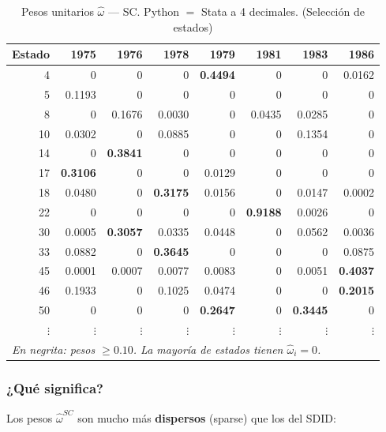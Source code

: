 \documentclass[11pt, a4paper]{article}
\begin{document}
\begin{table}[H]
\centering
\caption{Pesos unitarios $\hat{\omega}$ --- SC. Python $=$ Stata a 4 decimales. (Selección de estados)}
\small
\begin{tabular}{rrrrrrrr}
\toprule
Estado & 1975 & 1976 & 1978 & 1979 & 1981 & 1983 & 1986 \\
\midrule
4  & 0      & 0      & 0      & \textbf{0.4494} & 0      & 0      & 0.0162 \\
5  & 0.1193 & 0      & 0      & 0      & 0      & 0      & 0      \\
8  & 0      & 0.1676 & 0.0030 & 0      & 0.0435 & 0.0285 & 0      \\
10 & 0.0302 & 0      & 0.0885 & 0      & 0      & 0.1354 & 0      \\
14 & 0      & \textbf{0.3841} & 0      & 0      & 0      & 0      & 0      \\
17 & \textbf{0.3106} & 0      & 0      & 0.0129 & 0      & 0      & 0      \\
18 & 0.0480 & 0      & \textbf{0.3175} & 0.0156 & 0      & 0.0147 & 0.0002 \\
22 & 0      & 0      & 0      & 0      & \textbf{0.9188} & 0.0026 & 0      \\
30 & 0.0005 & \textbf{0.3057} & 0.0335 & 0.0448 & 0      & 0.0562 & 0.0036 \\
33 & 0.0882 & 0      & \textbf{0.3645} & 0      & 0      & 0      & 0.0875 \\
45 & 0.0001 & 0.0007 & 0.0077 & 0.0083 & 0      & 0.0051 & \textbf{0.4037} \\
46 & 0.1933 & 0      & 0.1025 & 0.0474 & 0      & 0      & \textbf{0.2015} \\
50 & 0      & 0      & 0      & \textbf{0.2647} & 0      & \textbf{0.3445} & 0      \\
$\vdots$ & $\vdots$ & $\vdots$ & $\vdots$ & $\vdots$ & $\vdots$ & $\vdots$ & $\vdots$ \\
\midrule
\multicolumn{8}{l}{\textit{En negrita: pesos $\geq 0.10$. La mayoría de estados tienen $\hat{\omega}_i=0$.}} \\
\bottomrule
\end{tabular}
\end{table}

\subsubsection*{¿Qué significa?}

Los pesos $\hat{\omega}^{SC}$ son mucho más \textbf{dispersos} (sparse) que los del SDID:
\end{document}
